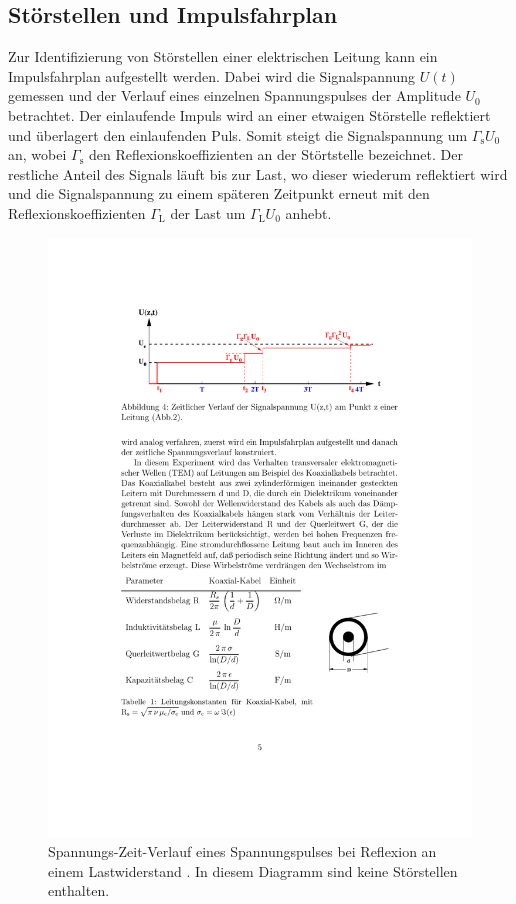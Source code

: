 \subsection{Störstellen und Impulsfahrplan} %
\label{sub:impulsfahrplan}
Zur Identifizierung von Störstellen einer elektrischen Leitung kann ein
Impulsfahrplan aufgestellt werden.
Dabei wird die Signalspannung $U(t)$ gemessen und der Verlauf eines einzelnen
Spannungspulses der Amplitude $U_0$ betrachtet.
Der einlaufende Impuls wird an einer etwaigen Störstelle reflektiert und
überlagert den einlaufenden Puls. Somit steigt die Signalspannung um
$\Gamma_\text{s}U_0$ an, wobei $\Gamma_\text{s}$ den Reflexionskoeffizienten
an der Störtstelle bezeichnet.
Der restliche Anteil des Signals läuft bis zur Last, wo dieser wiederum
reflektiert wird und die Signalspannung zu einem späteren Zeitpunkt erneut
mit den Reflexionskoeffizienten $\Gamma_\text{L}$ der Last um $\Gamma_\text{L}
U_0$ anhebt.
\begin{figure}[b]
    \center
    \includegraphics[width=0.9\linewidth]{img/spannung-zeit.pdf}
    \caption{
        Spannungs-Zeit-Verlauf eines Spannungspulses bei Reflexion an einem
        Lastwiderstand \cite{E02}.
        In diesem Diagramm sind keine Störstellen enthalten.
    }
    \label{fig:spannung-zeit}
\end{figure}
